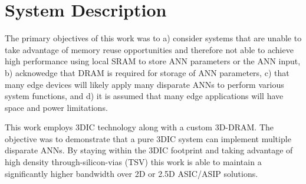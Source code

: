 \documentclass[journal]{IEEEtran}
\begin{document}
\section{System Description}
\label{System Description}


The primary objectives of this work was to a) consider systems that are unable to take advantage of memory reuse opportunities and therefore not able to achieve high performance using
local SRAM to store ANN parameters or the ANN input, b) acknowedge that DRAM is required for storage of ANN parameters, c) that many edge devices will likely apply many disparate ANNs
to perform various system functions, and d) it is assumed that many edge applications will have space and power limitations.

This work employs 3DIC technology along with a custom 3D-DRAM. The objective was to demonstrate that a pure 3DIC system can implement multiple disparate ANNs. By staying within the 3DIC footprint and taking advantage of high
density through-silicon-vias (TSV) this work is able to maintain a significantly higher bandwidth over 2D or 2.5D ASIC/ASIP solutions.
\end{document}
